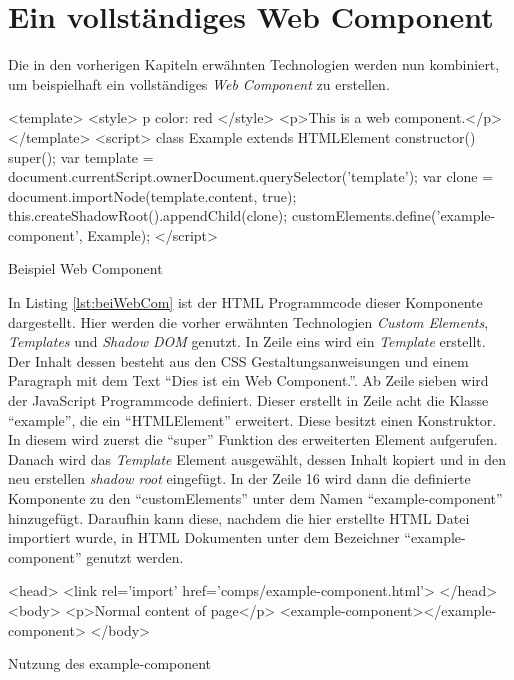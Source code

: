 \documentclass[12pt, paper=a4, bibtotoc, toc=listof, headsepline=true]{scrreprt}
\begin{document}
		\section{Ein vollständiges Web Component}
		Die in den vorherigen Kapiteln erwähnten Technologien werden nun kombiniert, um beispielhaft ein vollständiges \emph{Web Component} zu erstellen. 		\begin{listing}
			\begin{HTMLcode*}{}
<template>
   <style>
      p {color: red}
   </style>
   <p>This is a web component.</p>
</template>
<script>
   class Example extends HTMLElement {
      constructor() {
         super();
         var template = document.currentScript.ownerDocument.querySelector('template');
         var clone = document.importNode(template.content, true);
         this.createShadowRoot().appendChild(clone);
      }
   }
customElements.define('example-component', Example);
</script>
			\end{HTMLcode*}
			\caption{Beispiel Web Component}
			\label{lst:beiWebCom}
		\end{listing}
		In Listing \ref{lst:beiWebCom} ist der \ac{HTML} Programmcode dieser Komponente dargestellt. Hier werden die vorher erwähnten Technologien \emph{Custom Elements}, \emph{Templates} und \emph{Shadow DOM} genutzt. In Zeile eins wird ein \emph{Template} erstellt. Der Inhalt dessen besteht aus den \ac{CSS} Gestaltungsanweisungen und einem Paragraph mit dem Text \enquote{Dies ist ein Web Component.}. Ab Zeile sieben wird der JavaScript Programmcode definiert. Dieser erstellt in Zeile acht die Klasse \enquote{example}, die ein \enquote{HTMLElement} erweitert. Diese besitzt einen Konstruktor. In diesem wird zuerst die \enquote{super} Funktion des erweiterten Element aufgerufen. Danach wird das \emph{Template} Element ausgewählt, dessen Inhalt kopiert und in den neu erstellen \emph{shadow root} eingefügt. In der Zeile 16 wird dann die definierte Komponente zu den \enquote{customElements} unter dem Namen \enquote{example-component} hinzugefügt. Daraufhin kann diese, nachdem die hier erstellte \ac{HTML} Datei importiert wurde, in \ac{HTML} Dokumenten unter dem Bezeichner \enquote{example-component} genutzt werden.
\begin{listing}[H]
	\begin{HTMLcode*}{}
<head>
   <link rel='import' href='comps/example-component.html'>
</head>
<body>
   <p>Normal content of page</p>
   <example-component></example-component>
</body>
	\end{HTMLcode*}
	\caption{Nutzung des example-component}
	\label{lst:nutExaCom}
\end{listing}
\end{document}
